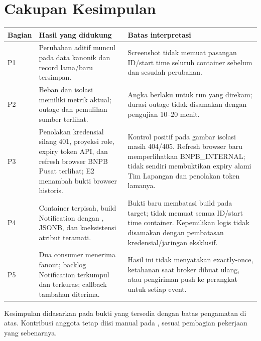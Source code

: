 \section{Cakupan Kesimpulan}
\begin{longtable}{@{}P{1.4cm}P{6.1cm}P{7.3cm}@{}}
\toprule \textbf{Bagian} & \textbf{Hasil yang didukung} & \textbf{Batas interpretasi}\\\midrule\endhead
P1 & Perubahan aditif muncul pada data kanonik dan record lama/baru tersimpan. & Screenshot tidak memuat pasangan ID/start time seluruh container sebelum dan sesudah perubahan.\\
P2 & Beban dan isolasi memiliki metrik aktual; outage dan pemulihan sumber terlihat. & Angka berlaku untuk run yang direkam; durasi outage tidak disamakan dengan pengujian 10--20 menit.\\
P3 & Penolakan kredensial silang 401, proyeksi role, expiry token API, dan refresh browser BNPB Pusat terlihat; E2 menambah bukti browser historis. & Kontrol positif pada gambar isolasi masih 404/405. Refresh browser baru memperlihatkan BNPB\_INTERNAL; tidak sendiri membuktikan expiry alami Tim Lapangan dan penolakan token lamanya.\\
P4 & Container terpisah, build Notification dengan , JSONB, dan koeksistensi atribut teramati. & Bukti baru membatasi build pada target; tidak memuat semua ID/start time container. Kepemilikan logis tidak disamakan dengan pembatasan kredensial/jaringan eksklusif.\\
P5 & Dua consumer menerima fanout; backlog Notification terkumpul dan terkuras; callback tambahan diterima. & Hasil ini tidak menyatakan exactly-once, ketahanan saat broker dibuat ulang, atau pengiriman push ke perangkat untuk setiap event.\\\bottomrule
\end{longtable}

Kesimpulan didasarkan pada bukti yang tersedia dengan batas pengamatan di atas. Kontribusi anggota tetap diisi manual pada , sesuai pembagian pekerjaan yang sebenarnya.
